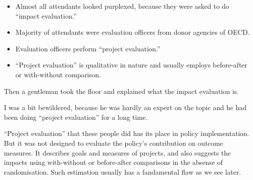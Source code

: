 \begin{frame}{}
\begin{itemize}
\vspace{1.0ex}\setlength{\itemsep}{1.0ex}\setlength{\baselineskip}{12pt}
\item	Almost all attendants looked purplexed, because they were asked to do ``impact evaluation.''
\item	Majority of attendants were evaluation officers from donor agencies of OECD.
\item	Evaluation officers perform ``project evaluation.'' 
\item	``Project evaluation'' is qualitative in nature and usually employs before-after or with-without comparison.
\end{itemize}
\end{frame}

\begin{frame}{}
Then a gentleman took the floor and explained what the impact evaluation is.

\vspace{2ex}
I was a bit bewildered, because he was hardly an expert on the topic and he had been doing ``project evaluation'' for a long time.

\vspace{2ex}
``Project evaluation'' that these people did has its place in policy implementation. But it was not designed to evaluate the policy's contribution on outcome measures. It describes goals and measures of projects, and also suggests the impacts using with-without or before-after comparisons in the absense of randomisation. Such estimation usually has a fandamental flaw as we see later.
\end{frame}

